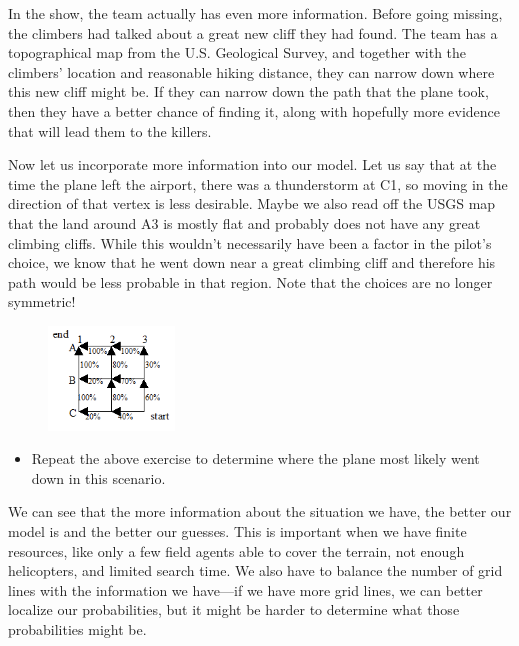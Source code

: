 In the show, the team actually has even more information. Before going missing, the climbers had talked about a great new cliff they had found. The team has a topographical map from the U.S. Geological Survey, and together with the climbers’ location and reasonable hiking distance, they can narrow down where this new cliff might be. If they can narrow down the path that the plane took, then they have a better chance of finding it, along with hopefully more evidence that will lead them to the killers.


Now let us incorporate more information into our model. Let us say that at the time the plane left the airport, there was a thunderstorm at C1, so moving in the direction of that vertex is less desirable. Maybe we also read off the USGS map that the land around A3 is mostly flat and probably does not have any great climbing cliffs. While this wouldn’t necessarily have been a factor in the pilot’s choice, we know that he went down near a great climbing cliff and therefore his path would be less probable in that region. Note that the choices are no longer symmetric!


	\begin{figure}
	\centering
	\includegraphics[width=0.3\textwidth]{../sections/seasons/season5/501/images/high_exposure.png}
	\end{figure}


\begin{itemize}
\item Repeat the above exercise to determine where the plane most likely went down in this scenario.
\end{itemize}


We can see that the more information about the situation we have, the better our model is and the better our guesses. This is important when we have finite resources, like only a few field agents able to cover the terrain, not enough helicopters, and limited search time. We also have to balance the number of grid lines with the information we have---if we have more grid lines, we can better localize our probabilities, but it might be harder to determine what those probabilities might be.